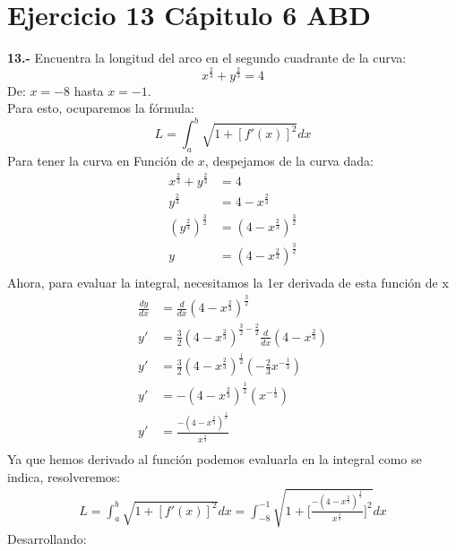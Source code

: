 \chapter*{Ejercicio 13 Cápitulo 6 ABD }

\textbf{13.-} Encuentra la longitud del arco en el segundo cuadrante de la curva:
\[
x^{\frac{2}{3}} + y^{\frac{2}{3}} = 4
\]
De: $x = -8$ hasta $x=-1$. \\
\newline
Para esto, ocuparemos la fórmula:
\[
L = \int_{a}^{b} \sqrt{1+ [f'(x)]^{2}} dx
\]
Para tener la curva en Función de $x$, despejamos de la curva dada:
\begin{align*}
    x^{\frac{2}{3}} + y^{\frac{2}{3}} &= 4 \\
    y^{\frac{2}{3}} &= 4 - x^{\frac{2}{3}} \\
   (y^{\frac{2}{3}})^{\frac{3}{2}} &= (4 - x^{\frac{2}{3}})^{\frac{3}{2}} \\
   y &= (4 - x^{\frac{2}{3}})^{\frac{3}{2}} \\ 
\end{align*}
Ahora, para evaluar la integral, necesitamos la 1er derivada de esta función de x 
\begin{align*}
    \frac{dy}{dx} &= \frac{d}{dx}(4 - x^{\frac{2}{3}})^{\frac{3}{2}} \\ 
    y' &= \frac{3}{2}(4 - x^{\frac{2}{3}})^{\frac{3}{2}- \frac{2}{2}} \frac{d}{dx}(4 - x^{\frac{2}{3}}) \\
    y' &= \frac{3}{2}(4 - x^{\frac{2}{3}})^{\frac{1}{2}} (-\frac{2}{3}x^{-\frac{1}{3}}) \\
    y' &= -(4 - x^{\frac{2}{3}})^{\frac{1}{2}} (x^{-\frac{1}{3}}) \\
     y' &= \frac{-(4 - x^{\frac{2}{3}})^{\frac{1}{2}}}{x^{\frac{1}{3}}} \\
\end{align*}
Ya que hemos derivado al función podemos evaluarla en la integral como se indica, resolveremos:
\begin{align*}
L = \int_{a}^{b} \sqrt{1+ [f'(x)]^{2}}dx =  \int_{-8}^{-1} \sqrt{1+ \Biggl[\frac{-(4 - x^{\frac{2}{3}})^{\frac{1}{2}}}{x^{\frac{1}{3}}}\Biggr]^{2}} dx
\end{align*}
Desarrollando:

